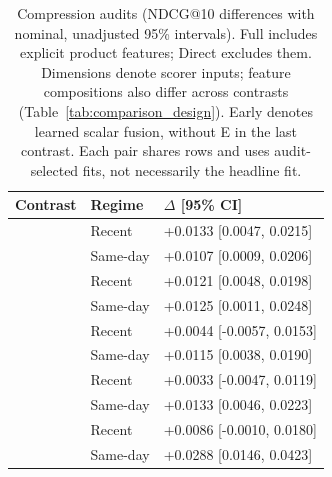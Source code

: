 \begin{table}[!htbp]
\renewcommand{\arraystretch}{1.10}
\caption{Compression audits (NDCG@10 differences with nominal, unadjusted 95\% intervals). Full includes explicit product features; Direct excludes them. Dimensions denote scorer inputs; feature compositions also differ across contrasts (Table~\ref{tab:comparison_design}). Early denotes learned scalar fusion, without E in the last contrast. Each pair shares rows and uses audit-selected fits, not necessarily the headline fit.}
\label{tab:compression}
\centering
\small
\setlength{\tabcolsep}{3pt}
\begin{tabular*}{\linewidth}{@{\extracolsep{\fill}}lll@{}}
\toprule
Contrast & Regime & $\Delta$ [95\% CI] \\
\midrule
{} & Recent & +0.0133 [0.0047, 0.0215] \\
 & Same-day & +0.0107 [0.0009, 0.0206] \\
 & Recent & +0.0121 [0.0048, 0.0198] \\
 & Same-day & +0.0125 [0.0011, 0.0248] \\
 & Recent & +0.0044 [-0.0057, 0.0153] \\
 & Same-day & +0.0115 [0.0038, 0.0190] \\
 & Recent & +0.0033 [-0.0047, 0.0119] \\
 & Same-day & +0.0133 [0.0046, 0.0223] \\
 & Recent & +0.0086 [-0.0010, 0.0180] \\
 & Same-day & +0.0288 [0.0146, 0.0423] \\
\bottomrule
\end{tabular*}
\end{table}
